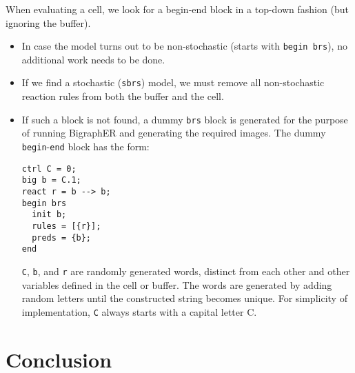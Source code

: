 \documentclass{article}
\begin{document}
When evaluating a cell, we look for a begin-end block in a top-down
fashion (but ignoring the buffer).
\begin{itemize}
\item In case the model turns out to be non-stochastic (starts with
  \texttt{begin brs}), no additional work needs to be done.
\item If we find a stochastic (\texttt{sbrs}) model, we must remove all
  non-stochastic reaction rules from both the buffer and the cell.
\item If such a block is not found, a dummy \texttt{brs} block is generated
  for the purpose of running BigraphER and generating the required images. The
  dummy \texttt{begin}-\texttt{end} block has the form:
  \begin{lstlisting}
ctrl C = 0;
big b = C.1;
react r = b --> b;
begin brs
  init b;
  rules = [{r}];
  preds = {b};
end
\end{lstlisting}
\texttt{C}, \texttt{b}, and \texttt{r} are randomly generated words,
distinct from each other and other variables defined in the cell or buffer.
The words are generated by adding random letters until the constructed
string becomes unique. For simplicity of implementation, \texttt{C} always
starts with a capital letter C.
\end{itemize}

\section{Conclusion}



\end{document}
